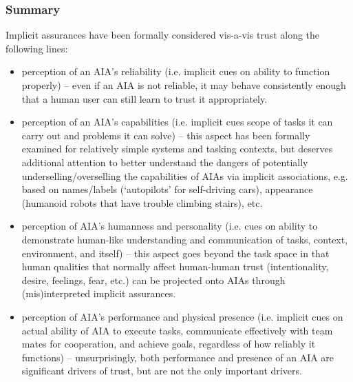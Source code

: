 \subsubsection{Summary}
Implicit assurances have been formally considered vis-a-vis trust along the following lines: 
\begin{itemize}
	\item perception of an AIA's reliability (i.e. implicit cues on ability to function properly) -- even if an AIA is not reliable, it may behave consistently enough that a human user can still learn to trust it appropriately. 
	\item perception of an AIA's capabilities (i.e. implicit cues scope of tasks it can carry out and problems it can solve) -- this aspect has  been formally examined for relatively simple systems and tasking contexts, but deserves additional attention to better understand the dangers of potentially underselling/overselling the capabilities of AIAs via implicit associations, e.g. based on names/labels (`autopilots' for self-driving cars), appearance (humanoid robots that have trouble climbing stairs), etc. 
	\item perception of AIA's humanness and personality (i.e. cues on ability to demonstrate human-like understanding and communication of tasks, context, environment, and itself) -- this aspect goes beyond the task space in that human qualities that normally affect human-human trust (intentionality, desire, feelings, fear, etc.) can be projected onto AIAs through (mis)interpreted implicit assurances.
	\item perception of AIA's performance and physical presence (i.e. implicit cues on actual ability of AIA to execute tasks, communicate effectively with team mates for cooperation, and achieve goals, regardless of how reliably it functions) -- unsurprisingly, both performance and presence of an AIA are significant drivers of trust, but are not the only important drivers.  
\end{itemize}

